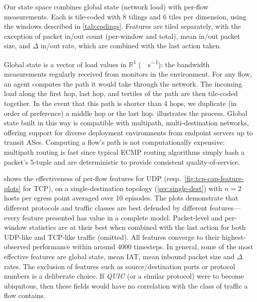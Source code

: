 \documentclass[10pt, times, conference, letterpaper]{IEEEtran}
\begin{document}
Our state space combines global state (network load) with per-flow measurements.
Each is tile-coded with 8 tilings and 6 tiles per dimension, using the windows described in \cref{tab:codings}.
Features are tiled separately, with the exception of packet in/out count (per-window and total), mean in/out packet size, and $\Delta$ in/out rate, which are combined with the last action taken.

Global state is a vector of load values in $\mathbb{R}^4$ (\si{\mega\bit\per\second}): the bandwidth measurements regularly received from monitors in the environment.
For any flow, an agent computes the path it would take through the network.
The incoming load along the first hop, last hop, and tertiles of the path are then tile-coded together.
In the event that this path is shorter than 4 hops, we duplicate (in order of preference) a middle hop or the last hop.
 illustrates the process.
Global state built in this way is compatible with multipath, multi-destination networks, offering support for diverse deployment environments from endpoint servers up to transit ASes.
Computing a flow's path is not computationally expensive: multipath routing is fast since typical ECMP routing algorithms simply hash a packet's 5-tuple and are deterministic to provide consistent quality-of-service.


 shows the effectiveness of per-flow features for UDP (resp.\ \cref{fig:tcp-cap-feature-plots} for TCP), on a single-destination topology (\cref{sec:single-dest}) with $n=2$ hosts per egress point averaged over 10 episodes.
The plots demonstrate that different protocols and traffic classes are best defended by different features---every feature presented has value in a complete model.
Packet-level and per-window statistics are at their best when combined with the last action for both UDP-like and TCP-like traffic (omitted).
All features converge to their highest-observed performance within around \num{4000} timesteps.
In general, some of the most effective features are global state, mean IAT, mean inbound packet size and $\Delta$ rates.
The exclusion of features such as source/destination ports or protocol numbers is a deliberate choice.
If \emph{QUIC} (or a similar protocol) were to become ubiquitous, then these fields would have no correlation with the class of traffic a flow contains.
\end{document}
